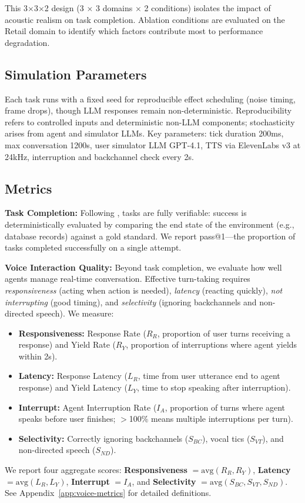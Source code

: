 This 3$\times$3$\times$2 design (3  $\times$ 3 domains $\times$ 2 conditions) isolates the impact of acoustic realism on task completion. Ablation conditions are evaluated on the Retail domain to identify which factors contribute most to performance degradation.

\subsection{Simulation Parameters}

Each task runs with a fixed seed for reproducible effect scheduling (noise timing, frame drops), though LLM responses remain non-deterministic. Reproducibility refers to controlled inputs and deterministic non-LLM components; stochasticity arises from agent and simulator LLMs. Key parameters: tick duration 200ms, max conversation 1200s, user simulator LLM GPT-4.1, TTS via ElevenLabs v3 at 24kHz, interruption and backchannel check every 2s.

\subsection{Metrics}

\textbf{Task Completion:} Following \tautwobench{}, tasks are fully verifiable: success is deterministically evaluated by comparing the end state of the environment (e.g., database records) against a gold standard. We report pass@1---the proportion of tasks completed successfully on a single attempt.

\textbf{Voice Interaction Quality:} Beyond task completion, we evaluate how well agents manage real-time conversation. Effective turn-taking requires \textit{responsiveness} (acting when action is needed), \textit{latency} (reacting quickly), \textit{not interrupting} (good timing), and \textit{selectivity} (ignoring backchannels and non-directed speech). We measure:
\begin{itemize}[nosep,leftmargin=*]
    \item \textbf{Responsiveness:} Response Rate ($R_R$, proportion of user turns receiving a response) and Yield Rate ($R_Y$, proportion of interruptions where agent yields within 2s).
    \item \textbf{Latency:} Response Latency ($L_R$, time from user utterance end to agent response) and Yield Latency ($L_Y$, time to stop speaking after interruption).
    \item \textbf{Interrupt:} Agent Interruption Rate ($I_A$, proportion of turns where agent speaks before user finishes; $>$100\% means multiple interruptions per turn).
    \item \textbf{Selectivity:} Correctly ignoring backchannels ($S_{BC}$), vocal tics ($S_{VT}$), and non-directed speech ($S_{ND}$).
\end{itemize}
We report four aggregate scores: \textbf{Responsiveness} $= \mathrm{avg}(R_R, R_Y)$, \textbf{Latency} $= \mathrm{avg}(L_R, L_Y)$, \textbf{Interrupt} $= I_A$, and \textbf{Selectivity} $= \mathrm{avg}(S_{BC}, S_{VT}, S_{ND})$. See Appendix~\ref{app:voice-metrics} for detailed definitions.
